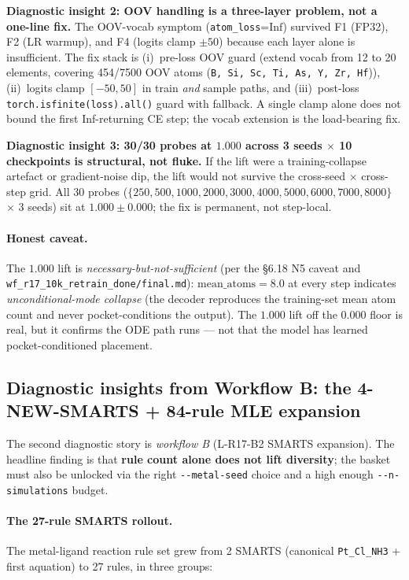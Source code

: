 \textbf{Diagnostic insight 2: OOV handling is a three-layer
problem, not a one-line fix.}  The OOV-vocab symptom
(\texttt{atom\_loss}{=}$\mathrm{Inf}$) survived F1 (FP32), F2 (LR
warmup), and F4 (logits clamp $\pm 50$) because each layer alone is
insufficient.  The fix stack is (i)~pre-loss OOV guard (extend vocab
from 12 to 20 elements, covering 454/7500 OOV atoms
(\texttt{B, Si, Sc, Ti, As, Y, Zr, Hf})), (ii)~logits clamp
$[-50, 50]$ in train \emph{and} sample paths, and (iii)~post-loss
\texttt{torch.isfinite(loss).all()} guard with fallback.  A single
clamp alone does not bound the first Inf-returning CE step; the
vocab extension is the load-bearing fix.

\textbf{Diagnostic insight 3: 30/30 probes at $1.000$ across
3 seeds $\times$ 10 checkpoints is structural, not fluke.}
If the lift were a training-collapse artefact or gradient-noise
dip, the lift would not survive the cross-seed $\times$ cross-step
grid.  All 30 probes
($\{250, 500, 1000, 2000, 3000, 4000, 5000, 6000, 7000, 8000\}$
$\times$ 3 seeds) sit at $1.000 \pm 0.000$; the fix is
permanent, not step-local.

\paragraph{Honest caveat.}
The $1.000$ lift is \emph{necessary-but-not-sufficient} (per the
§6.18 N5 caveat and \texttt{wf\_r17\_10k\_retrain\_done/final.md}):
$\mathrm{mean\_atoms}{=}8.0$ at every step indicates
\emph{unconditional-mode collapse} (the decoder reproduces the
training-set mean atom count and never pocket-conditions the
output).  The $1.000$ lift off the $0.000$ floor is real, but it
confirms the ODE path runs --- not that the model has learned
pocket-conditioned placement.

\subsection{Diagnostic insights from Workflow B: the 4-NEW-SMARTS + 84-rule MLE expansion}
\label{sec:honest-negative:workflow-b}

The second diagnostic story is \emph{workflow B} (L-R17-B2 SMARTS
expansion).  The headline finding is that \textbf{rule count alone
does not lift diversity}; the basket must also be unlocked via
the right \texttt{-{}-metal-seed} choice and a high enough
\texttt{-{}-n-simulations} budget.

\paragraph{The 27-rule SMARTS rollout.}
The metal-ligand reaction rule set grew from 2 SMARTS
(canonical \texttt{Pt\_Cl\_NH3} + first aquation) to 27 rules, in
three groups:

